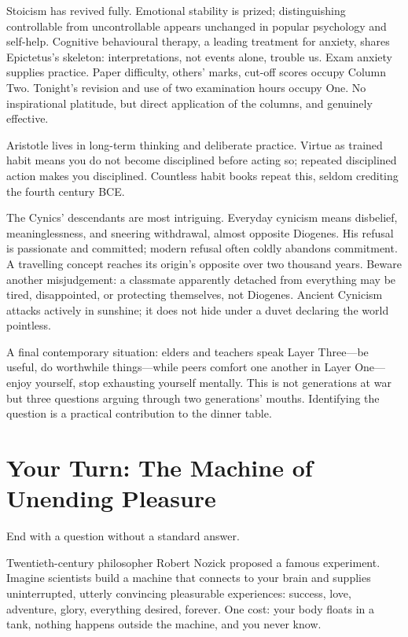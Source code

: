 Stoicism has revived fully. Emotional stability is prized; distinguishing controllable from uncontrollable appears unchanged in popular psychology and self-help. Cognitive behavioural therapy, a leading treatment for anxiety, shares Epictetus's skeleton: interpretations, not events alone, trouble us. Exam anxiety supplies practice. Paper difficulty, others' marks, cut-off scores occupy Column Two. Tonight's revision and use of two examination hours occupy One. No inspirational platitude, but direct application of the columns, and genuinely effective.

Aristotle lives in long-term thinking and deliberate practice. Virtue as trained habit means you do not become disciplined before acting so; repeated disciplined action makes you disciplined. Countless habit books repeat this, seldom crediting the fourth century BCE.

The Cynics' descendants are most intriguing. Everyday cynicism means disbelief, meaninglessness, and sneering withdrawal, almost opposite Diogenes. His refusal is passionate and committed; modern refusal often coldly abandons commitment. A travelling concept reaches its origin's opposite over two thousand years. Beware another misjudgement: a classmate apparently detached from everything may be tired, disappointed, or protecting themselves, not Diogenes. Ancient Cynicism attacks actively in sunshine; it does not hide under a duvet declaring the world pointless.

A final contemporary situation: elders and teachers speak Layer Three---be useful, do worthwhile things---while peers comfort one another in Layer One---enjoy yourself, stop exhausting yourself mentally. This is not generations at war but three questions arguing through two generations' mouths. Identifying the question is a practical contribution to the dinner table.

\section[Your Turn: The Endless-Pleasure Machine]{Your Turn: The Machine of Unending Pleasure}
End with a question without a standard answer.

Twentieth-century philosopher Robert Nozick proposed a famous experiment. Imagine scientists build a machine that connects to your brain and supplies uninterrupted, utterly convincing pleasurable experiences: success, love, adventure, glory, everything desired, forever. One cost: your body floats in a tank, nothing happens outside the machine, and you never know.

